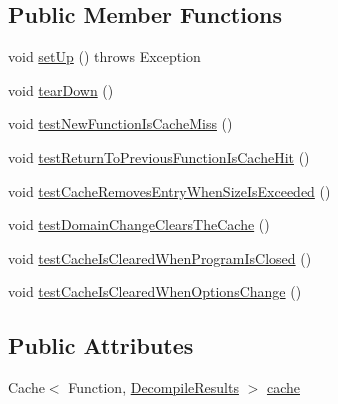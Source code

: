 \subsection*{Public Member Functions}
\begin{DoxyCompactItemize}
\item 
void \mbox{\hyperlink{classghidra_1_1app_1_1decompiler_1_1component_1_1_decompiler_caching_test_a0e48a81f6ea3ab8c421be7112d56cc5d}{set\+Up}} ()  throws Exception 
\item 
void \mbox{\hyperlink{classghidra_1_1app_1_1decompiler_1_1component_1_1_decompiler_caching_test_a8a15c9817200735ec6c196198a936327}{tear\+Down}} ()
\item 
void \mbox{\hyperlink{classghidra_1_1app_1_1decompiler_1_1component_1_1_decompiler_caching_test_aa095c7a8bac54b3742af88c70abb0580}{test\+New\+Function\+Is\+Cache\+Miss}} ()
\item 
void \mbox{\hyperlink{classghidra_1_1app_1_1decompiler_1_1component_1_1_decompiler_caching_test_a104816172537604f619c41b5a0031e32}{test\+Return\+To\+Previous\+Function\+Is\+Cache\+Hit}} ()
\item 
void \mbox{\hyperlink{classghidra_1_1app_1_1decompiler_1_1component_1_1_decompiler_caching_test_a82b196f3799c2602ac0b9153b3f0234c}{test\+Cache\+Removes\+Entry\+When\+Size\+Is\+Exceeded}} ()
\item 
void \mbox{\hyperlink{classghidra_1_1app_1_1decompiler_1_1component_1_1_decompiler_caching_test_aa952a248b476bf36e3bb2b95ffcf2bc4}{test\+Domain\+Change\+Clears\+The\+Cache}} ()
\item 
void \mbox{\hyperlink{classghidra_1_1app_1_1decompiler_1_1component_1_1_decompiler_caching_test_af6898ca5ff7e924e47636489a104813e}{test\+Cache\+Is\+Cleared\+When\+Program\+Is\+Closed}} ()
\item 
void \mbox{\hyperlink{classghidra_1_1app_1_1decompiler_1_1component_1_1_decompiler_caching_test_ad917874c22087468d2163b036ae8f6f1}{test\+Cache\+Is\+Cleared\+When\+Options\+Change}} ()
\end{DoxyCompactItemize}
\subsection*{Public Attributes}
\begin{DoxyCompactItemize}
\item 
Cache$<$ Function, \mbox{\hyperlink{classghidra_1_1app_1_1decompiler_1_1_decompile_results}{Decompile\+Results}} $>$ \mbox{\hyperlink{classghidra_1_1app_1_1decompiler_1_1component_1_1_decompiler_caching_test_a22e5cb23f95bca980829111149dce029}{cache}}
\end{DoxyCompactItemize}



